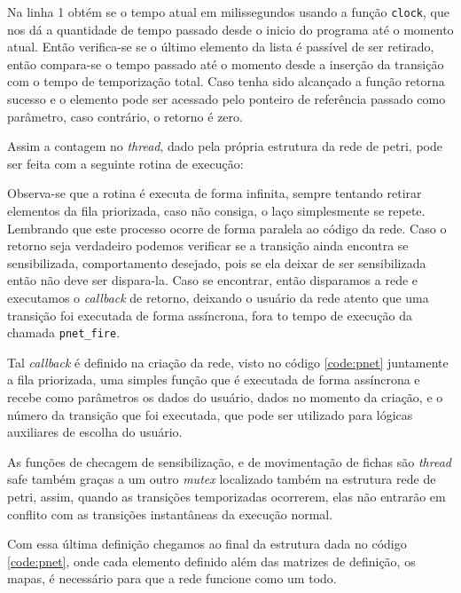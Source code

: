 Na linha 1 obtém se o tempo atual em milissegundos usando a função \lstinline{clock}, que nos dá a quantidade de tempo passado desde o inicio do programa até o momento atual. Então verifica-se se o último elemento da lista é passível de ser retirado, então compara-se o tempo passado até o momento desde a inserção da transição com o tempo de temporização total. Caso tenha sido alcançado a função retorna sucesso e o elemento pode ser acessado pelo ponteiro de referência passado como parâmetro, caso contrário, o retorno é zero.

Assim a contagem no \textit{thread}, dado pela própria estrutura da rede de petri, pode ser feita com a seguinte rotina de execução:



Observa-se que a rotina é executa de forma infinita, sempre tentando retirar elementos da fila priorizada, caso não consiga, o laço simplesmente se repete. Lembrando que este processo ocorre de forma paralela ao código da rede. Caso o retorno seja verdadeiro podemos verificar se a transição ainda encontra se sensibilizada, comportamento desejado, pois se ela deixar de ser sensibilizada então não deve ser dispara-la. Caso se encontrar, então disparamos a rede e executamos o \textit{callback} de retorno, deixando o usuário da rede atento que uma transição foi executada de forma assíncrona, fora to tempo de execução da chamada \lstinline{pnet_fire}. 

Tal \textit{callback} é definido na criação da rede, visto no código \ref{code:pnet} juntamente a fila priorizada, uma simples função que é executada de forma assíncrona e recebe como parâmetros os dados do usuário, dados no momento da criação, e o número da transição que foi executada, que pode ser utilizado para lógicas auxiliares de escolha do usuário.

As funções de checagem de sensibilização, e de movimentação de fichas são \textit{thread} safe também graças a um outro \textit{mutex} localizado também na estrutura rede de petri, assim, quando as transições temporizadas ocorrerem, elas não entrarão em conflito com as transições instantâneas da execução normal. 

Com essa última definição chegamos ao final da estrutura dada no código \ref{code:pnet}, onde cada elemento definido além das matrizes de definição, os mapas, é necessário para que a rede funcione como um todo.

